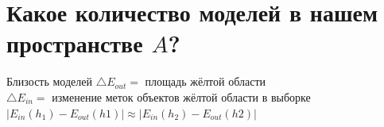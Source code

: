 \documentclass[10pt]{beamer}
\begin{document}
\section{Какое количество моделей в нашем пространстве $A$?}



\begin{frame}{Близость моделей}  
  $\bigtriangleup E_{out} = $ площадь жёлтой области\\
  \bigbreak
  $\bigtriangleup E_{in} = $ изменение меток объектов жёлтой области в выборке\\
  \bigbreak
  $\vert E_{in}(h_1) - E_{out}(h1) \vert \approx \vert E_{in}(h_2) - E_{out}(h2) \vert$  
\end{frame}
\end{document}
